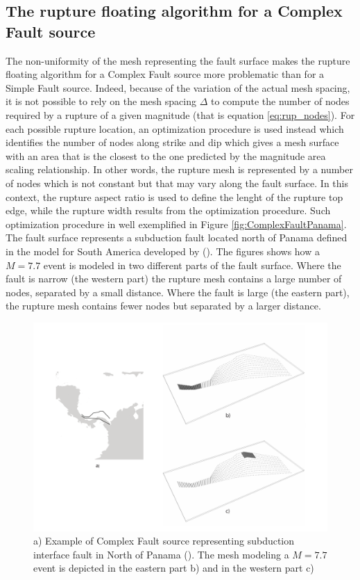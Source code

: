 \subsection{The rupture floating algorithm for a Complex Fault source}
The non-uniformity of the mesh representing the fault surface makes the rupture floating algorithm for a Complex
Fault source more problematic than for a Simple Fault source. Indeed, because of the variation of the actual mesh spacing, it is not possible to rely on the mesh spacing $\Delta$ to compute the number of nodes required by a rupture of a given magnitude (that is equation \ref{eq:rup_nodes}). For each possible rupture location, an optimization
procedure is used instead which identifies the number of nodes along strike and dip which gives a mesh surface with an area that is the closest to the one predicted by the magnitude area scaling relationship. In other words, the rupture mesh is represented by a number of nodes which is not constant but that may vary along the fault surface. In this context, the rupture aspect ratio is used to define the lenght of the rupture top edge, while the rupture width results from the optimization procedure. Such optimization procedure in well exemplified in Figure \ref{fig:ComplexFaultPanama}. The fault surface represents a subduction fault located north of Panama defined
in the model for South America developed by (\cite{petersen2010}). The figures shows how a $M=7.7$ event is modeled in two different parts of the fault surface. Where the fault is narrow (the western part) the rupture mesh
contains a large number of nodes, separated by a small distance. Where the fault is large (the eastern part), the
rupture mesh contains fewer nodes but separated by a larger distance.
\begin{figure}
\centering
\includegraphics[width=14cm]{./Pictures/ComplexFaultPanama.pdf}
\caption{a) Example of Complex Fault source representing subduction interface fault in North of Panama (\cite{petersen2010}). The mesh modeling a $M=7.7$ event is depicted in the eastern part b) and in the western part c)}
\label{fig:ComplexFaultSourcePanama}
\end{figure}

